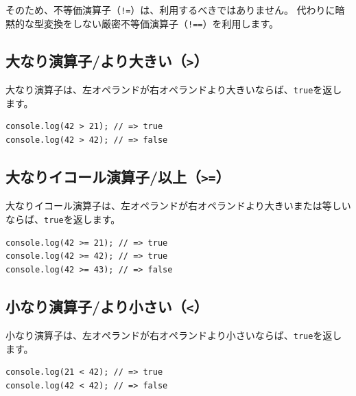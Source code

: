 そのため、不等価演算子（\texttt{!=}）は、利用するべきではありません。
\enlargethispage{\baselineskip}代わりに暗黙的な型変換をしない厳密不等価演算子（\texttt{!==}）を利用します。

\hypertarget{more-than}{%
\subsection{\texorpdfstring{大なり演算子/より大きい（\texttt{\textgreater{}}）}{大なり演算子/より大きい（\textgreater{}）}}\label{more-than}}

大なり演算子は、左オペランドが右オペランドより大きいならば、\texttt{true}を返します。

\begin{lstlisting}
console.log(42 > 21); // => true
console.log(42 > 42); // => false
\end{lstlisting}

\hypertarget{more-than-equal}{%
\subsection{\texorpdfstring{大なりイコール演算子/以上（\texttt{\textgreater{}=}）}{大なりイコール演算子/以上（\textgreater{}=）}}\label{more-than-equal}}

大なりイコール演算子は、左オペランドが右オペランドより大きいまたは等しいならば、\texttt{true}を返します。

\begin{lstlisting}
console.log(42 >= 21); // => true
console.log(42 >= 42); // => true
console.log(42 >= 43); // => false
\end{lstlisting}

\hypertarget{less-than}{%
\subsection{\texorpdfstring{小なり演算子/より小さい（\texttt{\textless{}}）}{小なり演算子/より小さい（\textless{}）}}\label{less-than}}

小なり演算子は、左オペランドが右オペランドより小さいならば、\texttt{true}を返します。

\begin{lstlisting}
console.log(21 < 42); // => true
console.log(42 < 42); // => false
\end{lstlisting}

